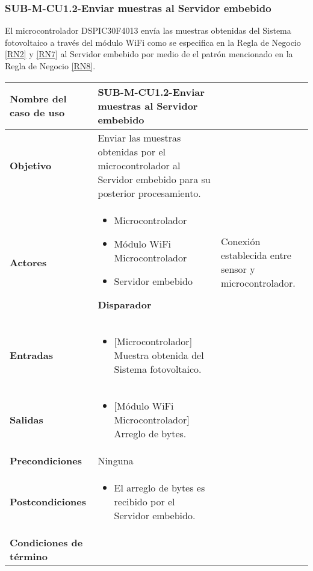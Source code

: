 \subsubsection{SUB-M-CU1.2-Enviar muestras al Servidor embebido}\label{SUB-M-CU1.2}
El microcontrolador DSPIC30F4013 envía las muestras obtenidas del Sistema fotovoltaico a través del módulo WiFi como se especifica en la Regla de Negocio \ref{RN2} y \ref{RN7} al Servidor embebido por medio de el patrón mencionado en la Regla de Negocio \ref{RN8}.
\begin{longtable}{|J{5cm}|J{10.3cm}|}
	\hline
	\textbf{Nombre del caso de uso} &
		SUB-M-CU1.2-Enviar muestras al Servidor embebido \\ \hline
	\textbf{Objetivo} &
		Enviar las muestras obtenidas por el microcontrolador al Servidor embebido para su posterior procesamiento. \\ \hline
	\textbf{Actores} &
	    \begin{itemize}
		    \item Microcontrolador
		    \item Módulo WiFi Microcontrolador
		    \item Servidor embebido
		\end{itemize} \hline 
	\textbf{Disparador} & 
		Conexión establecida entre sensor y microcontrolador.\\ \hline
	\textbf{Entradas} & %
		\begin{itemize}%
				\item {[Microcontrolador]} Muestra obtenida del Sistema fotovoltaico.
		\end{itemize}
		\\ \hline 
	\textbf{Salidas} & 
	    \begin{itemize}%
	        \item {[Módulo WiFi Microcontrolador]} Arreglo de bytes.
	    \end{itemize}\\ \hline
	\textbf{Precondiciones} & Ninguna
		\\ \hline
	\textbf{Postcondiciones} &
		\begin{itemize}
			\item El arreglo de bytes es recibido por el Servidor embebido.
		\end{itemize} \\ \hline
	\textbf{Condiciones de término} & 
		\begin{itemize}

\end{itemize}
\end{longtable}
